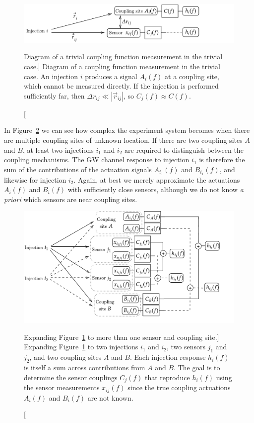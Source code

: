 \begin{figure}[h]
	\includegraphics[width=\textwidth]{figures/noise-methods/cf-cartoon-simple.pdf}
	\caption
	[Diagram of a trivial coupling function measurement in the trivial case.]
	{
		Diagram of a coupling function measurement in the trivial case.
		An injection $i$ produces a signal $A_i(f)$ at a coupling site, which cannot be measured directly.
		If the injection is performed sufficiently far, then $\Delta r_{ij} \ll |\vec{r}_{ij}|$, so $C_j(f) \approx C(f)$.
	}
	\label{fig:cf-cartoon-simple}
\end{figure}

In Figure~\ref{fig:cf-cartoon-full} we can see how complex the experiment system becomes when there are multiple coupling sites of unknown location.
If there are two coupling sites $A$ and $B$, at least two injections $i_1$ and $i_2$ are required to distinguish between the coupling mechanisms.
The \ac{GW} channel response to injection $i_1$ is therefore the sum of the contributions of the actuation signals $A_{i_1}(f)$ and $B_{i_1}(f)$, and likewise for injection ${i_2}$.
Again, at best we merely approximate the actuations $A_i(f)$ and $B_i(f)$ with sufficiently close sensors, although we do not know \textit{a priori} which sensors are near coupling sites.

\begin{figure}[h]
	\includegraphics[width=\textwidth]{figures/noise-methods/cf-cartoon-full.pdf}
	\caption
	[Expanding Figure~\ref{fig:cf-cartoon-simple} to more than one sensor and coupling site.]
	{
		Expanding Figure~\ref{fig:cf-cartoon-simple} to two injections $i_1$ and $i_2$, two sensors $j_1$ and $j_2$, and two coupling sites $A$ and $B$.
		Each injection response $h_i(f)$ is itself a sum across contributions from $A$ and $B$.
		The goal is to determine the sensor couplings $C_j(f)$ that reproduce $h_i(f)$ using the sensor measurements $x_{ij}(f)$ since the true coupling actuations $A_i(f)$ and $B_i(f)$ are not known.
	}
	\label{fig:cf-cartoon-full}
\end{figure}

